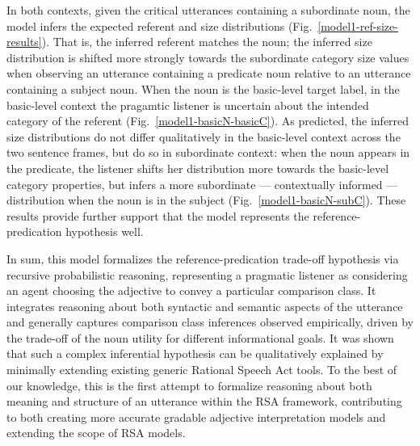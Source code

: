 In both contexts, given the critical utterances containing a subordinate noun, the model infers the expected referent and size distributions (Fig.~\ref{model1-ref-size-results}). That is, the inferred referent matches the noun; the inferred size distribution is shifted more strongly towards the subordinate category size values when observing an utterance containing a predicate noun relative to an utterance containing a subject noun. 
When the noun is the basic-level target label, in the basic-level context the pragamtic listener is uncertain about the intended category of the referent (Fig.~\ref{model1-basicN-basicC}). As predicted, the inferred size distributions do not differ qualitatively in the basic-level context across the two sentence frames, but do so in subordinate context: when the noun appears in the predicate, the listener shifts her distribution more towards the basic-level category properties, but infers a more subordinate --- contextually informed --- distribution when the noun is in the subject (Fig.~\ref{model1-basicN-subC}). These results provide further support that the model represents the reference-predication hypothesis well.

In sum, this model formalizes the reference-predication trade-off hypothesis via recursive probabilistic reasoning, representing a pragmatic listener as considering an agent choosing the adjective to convey a particular comparison class. It integrates reasoning about both syntactic and semantic aspects of the utterance and generally captures comparison class inferences observed empirically, driven by the trade-off of the noun utility for different informational goals. It was shown that such a complex inferential hypothesis can be qualitatively explained by minimally extending existing generic Rational Speech Act tools. To the best of our knowledge, this is the first attempt to formalize reasoning about both meaning and structure of an utterance within the RSA framework,  contributing to both creating more accurate gradable adjective interpretation models and extending the scope of RSA models. 
